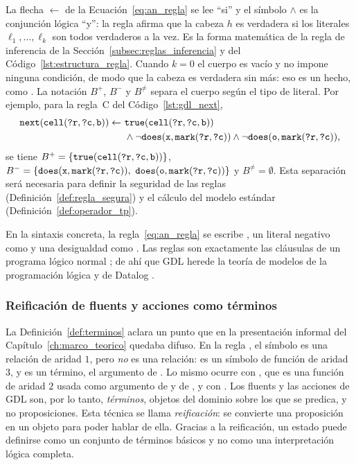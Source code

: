 La flecha $\leftarrow$ de la Ecuación~\eqref{eq:an_regla} se lee ``si'' y el símbolo $\land$ es la conjunción lógica ``y'': la regla afirma que la cabeza $h$ es verdadera si los literales $\ell_1, \dots, \ell_k$ son todos verdaderos a la vez. Es la forma matemática de la regla de inferencia de la Sección~\ref{subsec:reglas_inferencia} y del Código~\ref{lst:estructura_regla}. Cuando $k = 0$ el cuerpo es vacío y no impone ninguna condición, de modo que la cabeza es verdadera sin más: eso es un hecho, como . La notación $B^+$, $B^-$ y $B^{\neq}$ separa el cuerpo según el tipo de literal. Por ejemplo, para la regla~C del Código~\ref{lst:gdl_next},
\begin{align*}
    \texttt{next}(\texttt{cell}(\texttt{?r}, \texttt{?c}, \texttt{b})) \leftarrow\ & \texttt{true}(\texttt{cell}(\texttt{?r}, \texttt{?c}, \texttt{b}))\\
    & \land \neg\texttt{does}(\texttt{x}, \texttt{mark}(\texttt{?r}, \texttt{?c})) \land \neg\texttt{does}(\texttt{o}, \texttt{mark}(\texttt{?r}, \texttt{?c})),
\end{align*}
se tiene $B^+ = \{\texttt{true}(\texttt{cell}(\texttt{?r}, \texttt{?c}, \texttt{b}))\}$, $B^- = \{\texttt{does}(\texttt{x}, \texttt{mark}(\texttt{?r}, \texttt{?c})),\ \texttt{does}(\texttt{o}, \texttt{mark}(\texttt{?r}, \texttt{?c}))\}$ y $B^{\neq} = \emptyset$. Esta separación será necesaria para definir la seguridad de las reglas (Definición~\ref{def:regla_segura}) y el cálculo del modelo estándar (Definición~\ref{def:operador_tp}).

En la sintaxis concreta, la regla~\eqref{eq:an_regla} se escribe , un literal negativo como  y una desigualdad como . Las reglas son exactamente las cláusulas de un programa lógico normal \cite{Lloyd1987}; de ahí que GDL herede la teoría de modelos de la programación lógica y de Datalog \cite{CeriGottlobTanca1989, AbiteboulHullVianu1995}.

\subsubsection{Reificación de fluents y acciones como términos}

La Definición~\ref{def:terminos} aclara un punto que en la presentación informal del Capítulo~\ref{ch:marco_teorico} quedaba difuso. En la regla , el símbolo  es una relación de aridad $1$, pero  \emph{no} es una relación: es un símbolo de función de aridad $3$, y  es un término, el argumento de . Lo mismo ocurre con , que es una función de aridad $2$ usada como argumento de  y de , y con . Los fluents y las acciones de GDL son, por lo tanto, \emph{términos}, objetos del dominio sobre los que se predica, y no proposiciones. Esta técnica se llama \emph{reificación}: se convierte una proposición en un objeto para poder hablar de ella. Gracias a la reificación, un estado puede definirse como un conjunto de términos básicos y no como una interpretación lógica completa.

